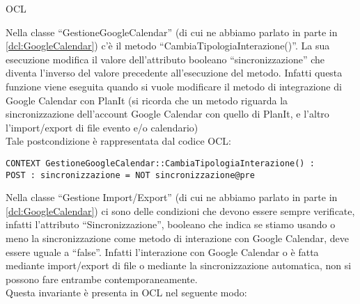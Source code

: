 \begin{listaPersonale}{OCL}
    \begin{center}
        
    \end{center}
    Nella classe “GestioneGoogleCalendar” (di cui ne abbiamo parlato in parte in \ref{dcl:GoogleCalendar}) c'è il metodo “CambiaTipologiaInterazione()”. La sua esecuzione modifica il valore dell'attributo booleano “sincronizzazione” che diventa l'inverso del valore precedente all'esecuzione del metodo. Infatti questa funzione viene eseguita quando si vuole modificare il metodo di integrazione di Google Calendar con PlanIt (si ricorda che un metodo riguarda la sincronizzazione dell'account Google Calendar con quello di PlanIt, e l'altro l'import/export di file evento e/o calendario)\\
    Tale postcondizione è rappresentata dal codice OCL:
    \begin{lstlisting}
CONTEXT GestioneGoogleCalendar::CambiaTipologiaInterazione() :
POST : sincronizzazione = NOT sincronizzazione@pre 
    \end{lstlisting}




    \begin{center}
        
    \end{center}
    Nella classe “Gestione Import/Export” (di cui ne abbiamo parlato in parte in \ref{dcl:GoogleCalendar}) ci sono delle condizioni che devono essere sempre verificate, infatti l’attributo “Sincronizzazione”, booleano che indica se stiamo usando  o meno la sincronizzazione come metodo di interazione con Google Calendar, deve essere uguale a “false”. Infatti l’interazione con Google Calendar o è fatta mediante import/export di file o mediante la sincronizzazione automatica, non si possono fare entrambe contemporaneamente.\\
    Questa invariante è presenta in OCL nel seguente modo:


\end{listaPersonale}
